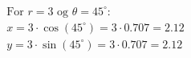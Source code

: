 \documentclass[preview]{standalone}
\begin{document}
\begin{align*}
\text{For } r = 3 \text{ og } \theta = 45^\circ:\\ x = 3 \cdot \cos(45^\circ) = 3 \cdot 0.707 = 2.12\\ y = 3 \cdot \sin(45^\circ) = 3 \cdot 0.707 = 2.12
\end{align*}
\end{document}
